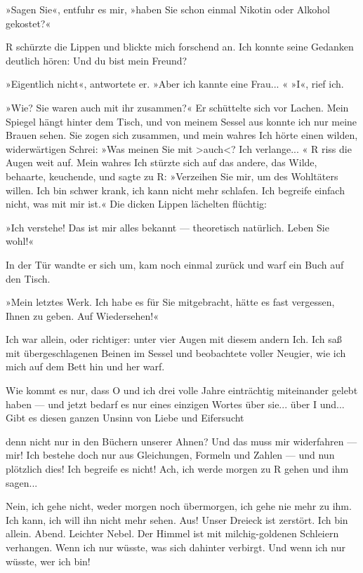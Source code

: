 »Sagen Sie«, entfuhr es mir, »haben Sie schon einmal Nikotin oder
Alkohol gekostet?«

R schürzte die Lippen und blickte mich forschend an. Ich konnte
seine Gedanken deutlich hören: Und du bist mein Freund?

»Eigentlich nicht«, antwortete er. »Aber ich kannte eine Frau... «
»I«, rief ich.

»Wie? Sie waren auch mit ihr zusammen?« Er schüttelte sich vor
Lachen. Mein Spiegel hängt hinter dem Tisch, und von meinem Sessel
aus konnte ich nur meine Brauen sehen. Sie zogen sich zusammen, und
mein wahres Ich hörte einen wilden, widerwärtigen Schrei: »Was
meinen Sie mit \textgreater{}auch\textless{}? Ich verlange... « R
riss die Augen weit auf. Mein wahres Ich stürzte sich auf das
andere, das Wilde, behaarte, keuchende, und sagte zu R: »Verzeihen
Sie mir, um des Wohltäters willen. Ich bin schwer krank, ich kann
nicht mehr schlafen. Ich begreife einfach nicht, was mit mir ist.«
Die dicken Lippen lächelten flüchtig:

»Ich verstehe! Das ist mir alles bekannt — theoretisch natürlich.
Leben Sie wohl!«

In der Tür wandte er sich um, kam noch einmal zurück und warf ein
Buch auf den Tisch.

»Mein letztes Werk. Ich habe es für Sie mitgebracht, hätte es fast
vergessen, Ihnen zu geben. Auf Wiedersehen!«

Ich war allein, oder richtiger: unter vier Augen mit diesem andern
Ich. Ich saß mit übergeschlagenen Beinen im Sessel und beobachtete
voller Neugier, wie ich mich auf dem Bett hin und her warf.

Wie kommt es nur, dass O und ich drei volle Jahre einträchtig
miteinander gelebt haben — und jetzt bedarf es nur eines einzigen
Wortes über sie... über I und... Gibt es diesen ganzen Unsinn von
Liebe und Eifersucht

denn nicht nur in den Büchern unserer Ahnen? Und das muss mir
widerfahren — mir! Ich bestehe doch nur aus Gleichungen, Formeln
und Zahlen — und nun plötzlich dies! Ich begreife es nicht! Ach,
ich werde morgen zu R gehen und ihm sagen...

Nein, ich gehe nicht, weder morgen noch übermorgen, ich gehe nie
mehr zu ihm. Ich kann, ich will ihn nicht mehr sehen. Aus! Unser
Dreieck ist zerstört. Ich bin allein. Abend. Leichter Nebel. Der
Himmel ist mit milchig-goldenen Schleiern verhangen. Wenn ich nur
wüsste, was sich dahinter verbirgt. Und wenn ich nur wüsste, wer
ich bin!

